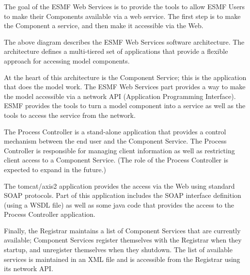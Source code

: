 %


The goal of the ESMF Web Services is to provide the tools to allow ESMF Users to make 
their Components available via a web service.  The first step is to make the Component 
a service, and then make it accessible via the Web.  

The above diagram describes the ESMF Web Services software architecture. The architecture 
defines a multi-tiered set of applications that provide a flexible approach for accessing 
model components. 

At the heart of this architecture is the Component Service; this is the 
application that does the model work.  The ESMF Web Services part provides a way to make 
the model accessible via a network API (Application Programming Interface). ESMF provides 
the tools to turn a model component into a service as well as the tools to access the 
service from the network. 

The Process Controller is a stand-alone application that provides a control mechanism between 
the end user and the Component Service.  The Process Controller is responsible for managing 
client information as well as restricting client access to a Component Service.  
(The role of the Process Controller is expected to expand in the future.)

The tomcat/axis2 application provides the access via the Web using standard SOAP 
protocols. Part of this application includes the SOAP interface definition 
(using a WSDL file) as well as some java code that provides the access to the Process 
Controller application.

Finally, the Registrar maintains a list of Component Services that are currently 
available;  Component Services register themselves with the Registrar when they 
startup, and unregister themselves when they shutdown.  The list of available services 
is maintained in an XML file and is accessible from the Registrar using its network API.

